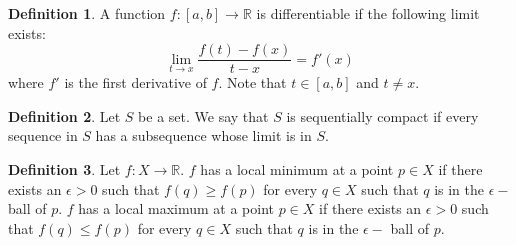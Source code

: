 \documentclass[12pt]{article}
\theoremstyle{definition}
\newtheorem{definition}{Definition}
\theoremstyle{named}
\begin{document}
\renewcommand{\thedefinition}{5.1}
\begin{definition}
    A function $f: [a,b] \to \mathbb{R}$ is differentiable if the following limit exists: 
    $$
    \lim_{t \to x} \frac{f(t) - f(x)}{t-x} = f'(x)
    $$
    where $f'$ is the first derivative of $f$. Note that $t \in [a,b]$ and $t \neq x$. 
\end{definition}

\renewcommand{\thedefinition}{of Sequentially Compact}
\begin{definition}
    Let $S$ be a set. We say that $S$ is sequentially compact if every sequence in $S$ has a subsequence whose limit is in $S$. 
\end{definition}

\renewcommand{\thedefinition}{5.7}
\begin{definition}
    Let $f: X \to \mathbb{R}$. $f$ has a local minimum at a point $p \in X$ if there exists an $\epsilon > 0$ such that $f(q) \geq f(p)$ for every $q \in X$ such that $q$ is in the $\epsilon-$ ball of $p$. $f$ has a local maximum at a point $p \in X$ if there exists an $\epsilon > 0$ such that $f(q) \leq f(p)$ for every $q \in X$ such that $q$ is in the $\epsilon-$ ball of $p$. 
\end{definition}
\end{document}
